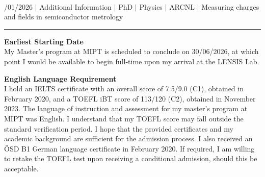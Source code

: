 \documentclass[a4paper,12pt]{article}
\begin{document}
{\centering
  {\scshape {}} \\ 
  {\fontsize{10}{10}/01/2026} $|$
  {\fontsize{10}{10}\selectfont Additional Information} $|$
  {\fontsize{10}{10}\selectfont PhD} $|$
  {\fontsize{10}{10}\selectfont Physics} $|$
  {\fontsize{10}{10}\selectfont ARCNL} $|$
  {\fontsize{10}{10}\selectfont Measuring charges and fields in semiconductor metrology}
\par}
\vspace{-15pt}
\noindent\rule{\textwidth}{0.5pt}

\vspace{-10pt}

\noindent \textbf{Earliest Starting Date}\\
My Master's program at MIPT is scheduled to conclude on 30/06/2026, at which point I would be available to begin full-time upon my arrival at the LENSIS Lab.

\noindent \textbf{English Language Requirement}\\
I hold an IELTS certificate with an overall score of 7.5/9.0 (C1), obtained in February 2020, and a TOEFL iBT score of 113/120 (C2), obtained in November 2023. The language of instruction and assessment for my master’s program at MIPT was English. I understand that my TOEFL score may fall outside the standard verification period. I hope that the provided certificates and my academic background are sufficient for the admission process. I also received an ÖSD B1 German language certificate in February 2020. If required, I am willing to retake the TOEFL test upon receiving a conditional admission, should this be acceptable.
\end{document}
